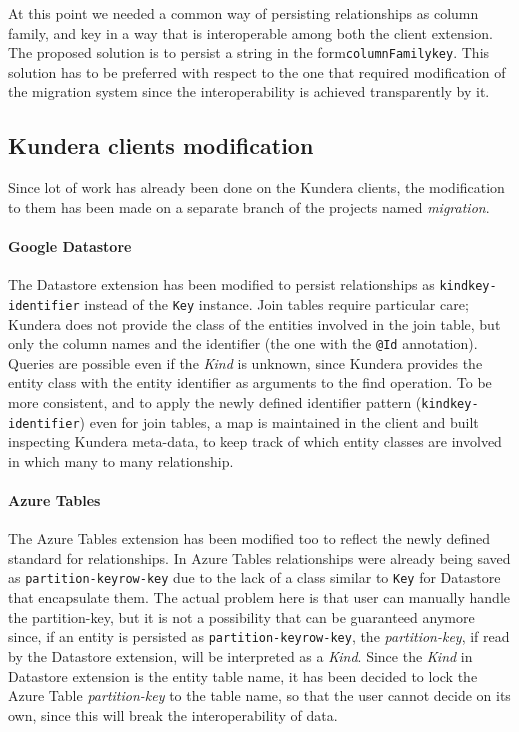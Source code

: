 \noindent At this point we needed a common way of persisting relationships as column family, and key in a way that is interoperable among both the client extension.
The proposed solution is to persist a string in the form\texttt{columnFamily\textunderscore key}. This solution has to be preferred with respect to the one that required modification of the migration system since the interoperability is achieved transparently by it.

\subsection{Kundera clients modification}
Since lot of work has already been done on the Kundera clients, the modification to them has been made on a separate branch of the projects named \textit{migration}.

\paragraph{Google Datastore} The Datastore extension has been modified to persist relationships as \texttt{kind\textunderscore key-identifier} instead of the \texttt{Key} instance.
Join tables require particular care; Kundera does not provide the class of the entities involved in the join table, but only the column names and the identifier (the one with the \texttt{@Id} annotation). Queries are possible even if the \textit{Kind} is unknown, since Kundera provides the entity class with the entity identifier as arguments to the find operation.
To be more consistent, and to apply the newly defined identifier pattern (\texttt{kind\textunderscore key-identifier}) even for join tables, a map is maintained in the client and built inspecting Kundera meta-data, to keep track of which entity classes are involved in which many to many relationship.

\paragraph{Azure Tables} The Azure Tables extension has been modified too to reflect the newly defined standard for relationships. In Azure Tables relationships were already being saved as \texttt{partition-key\textunderscore row-key} due to the lack of a class similar to \texttt{Key} for Datastore that encapsulate them. The actual problem here is that user can manually handle the partition-key, but it is not a possibility that can be guaranteed anymore since, if an entity is persisted as \texttt{partition-key\textunderscore row-key}, the \textit{partition-key}, if read by the Datastore extension, will be interpreted as a \textit{Kind}.
Since the \textit{Kind} in Datastore extension is the entity table name, it has been decided to lock the Azure Table \textit{partition-key} to the table name, so that the user cannot decide on its own, since this will break the interoperability of data.

